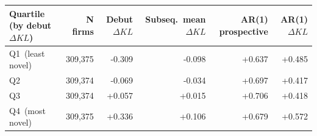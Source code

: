 \begin{tabular}{lrrrrr}
\toprule
Quartile (by debut $\Delta KL$) & N firms & Debut $\Delta KL$ & Subseq.\ mean $\Delta KL$ & AR(1) prospective & AR(1) $\Delta KL$ \\
\midrule
Q1 \,(least novel) & 309,375 & -0.309 & -0.098 & +0.637 & +0.485 \\
Q2 & 309,374 & -0.069 & -0.034 & +0.697 & +0.417 \\
Q3 & 309,374 & +0.057 & +0.015 & +0.706 & +0.418 \\
Q4 \,(most novel) & 309,375 & +0.336 & +0.106 & +0.679 & +0.572 \\
\bottomrule
\end{tabular}
